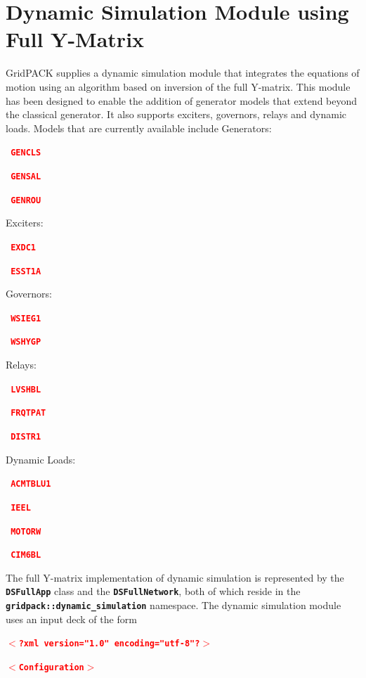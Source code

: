 \documentclass[12pt]{report} %
\begin{document}
\section{Dynamic Simulation Module using Full Y-Matrix}

GridPACK supplies a dynamic simulation module that integrates the equations of motion using an algorithm based on inversion of the full Y-matrix. This module has been designed to enable the addition of generator models that extend beyond the classical generator. It also supports exciters, governors, relays and dynamic loads. Models that are currently available include
Generators:

\textcolor{red}{\texttt{\textbf{  GENCLS}}}

\textcolor{red}{\texttt{\textbf{  GENSAL}}}

\textcolor{red}{\texttt{\textbf{  GENROU}}}

Exciters:

\textcolor{red}{\texttt{\textbf{  EXDC1}}}

\textcolor{red}{\texttt{\textbf{  ESST1A}}}

Governors:

\textcolor{red}{\texttt{\textbf{  WSIEG1}}}

\textcolor{red}{\texttt{\textbf{  WSHYGP}}}

Relays:

\textcolor{red}{\texttt{\textbf{  LVSHBL}}}

\textcolor{red}{\texttt{\textbf{  FRQTPAT}}}

\textcolor{red}{\texttt{\textbf{  DISTR1}}}

Dynamic Loads:

\textcolor{red}{\texttt{\textbf{  ACMTBLU1}}}

\textcolor{red}{\texttt{\textbf{  IEEL}}}

\textcolor{red}{\texttt{\textbf{  MOTORW}}}

\textcolor{red}{\texttt{\textbf{  CIM6BL}}}

The full Y-matrix implementation of dynamic simulation is represented by the \texttt{\textbf{DSFullApp}} class and the \texttt{\textbf{DSFullNetwork}}, both of which reside in the \texttt{\textbf{gridpack::dynamic\_simulation}} namespace.
The dynamic simulation module uses an input deck of the form

\textcolor{red}{\texttt{\textbf{$\boldsymbol{\mathrm{<}}$?xml version="1.0" encoding="utf-8"?$\boldsymbol{\mathrm{>}}$}}}

\textcolor{red}{\texttt{\textbf{$\boldsymbol{\mathrm{<}}$Configuration$\boldsymbol{\mathrm{>}}$}}}
\end{document}

